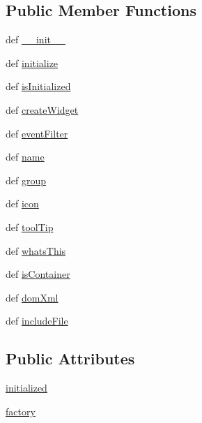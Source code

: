 \subsection*{Public Member Functions}
\begin{DoxyCompactItemize}
\item 
def \hyperlink{classhighlightedtexteditplugin_1_1HighlightedTextEditPlugin_a9f7cee32980843141b732fb0d0069f80}{\+\_\+\+\_\+init\+\_\+\+\_\+}
\item 
def \hyperlink{classhighlightedtexteditplugin_1_1HighlightedTextEditPlugin_ad11a9713bd2b0fe05bcd5732da1bcbfa}{initialize}
\item 
def \hyperlink{classhighlightedtexteditplugin_1_1HighlightedTextEditPlugin_a1bc98c9d59556ef865829cfef49f7f23}{is\+Initialized}
\item 
def \hyperlink{classhighlightedtexteditplugin_1_1HighlightedTextEditPlugin_ab1a3f4c5265d4438a8b749febd8187ee}{create\+Widget}
\item 
def \hyperlink{classhighlightedtexteditplugin_1_1HighlightedTextEditPlugin_a55c342c52d982b1edd7df7c4cfac975d}{event\+Filter}
\item 
def \hyperlink{classhighlightedtexteditplugin_1_1HighlightedTextEditPlugin_aabfdd83631d8d5a42dd991233cb8c9e3}{name}
\item 
def \hyperlink{classhighlightedtexteditplugin_1_1HighlightedTextEditPlugin_abcc1155b72ff210babf4f975f51757a2}{group}
\item 
def \hyperlink{classhighlightedtexteditplugin_1_1HighlightedTextEditPlugin_a925ce432df80ae15be6483d74e133497}{icon}
\item 
def \hyperlink{classhighlightedtexteditplugin_1_1HighlightedTextEditPlugin_a6776aebf4b63714b251cbc86198073a0}{tool\+Tip}
\item 
def \hyperlink{classhighlightedtexteditplugin_1_1HighlightedTextEditPlugin_a646dc86a2628090ef7f26461b0a63d53}{whats\+This}
\item 
def \hyperlink{classhighlightedtexteditplugin_1_1HighlightedTextEditPlugin_a935305bd473c33cdc88e02301b8eb161}{is\+Container}
\item 
def \hyperlink{classhighlightedtexteditplugin_1_1HighlightedTextEditPlugin_a1c6eba2a57bcd4a7ae694473a28abf57}{dom\+Xml}
\item 
def \hyperlink{classhighlightedtexteditplugin_1_1HighlightedTextEditPlugin_a37c5ed7d62fd2225f028e26d02106411}{include\+File}
\end{DoxyCompactItemize}
\subsection*{Public Attributes}
\begin{DoxyCompactItemize}
\item 
\hyperlink{classhighlightedtexteditplugin_1_1HighlightedTextEditPlugin_ab61f5541b65bb10aeede3dc35b070be0}{initialized}
\item 
\hyperlink{classhighlightedtexteditplugin_1_1HighlightedTextEditPlugin_a543655d181fa59a15e8cefc7023bba07}{factory}
\end{DoxyCompactItemize}



